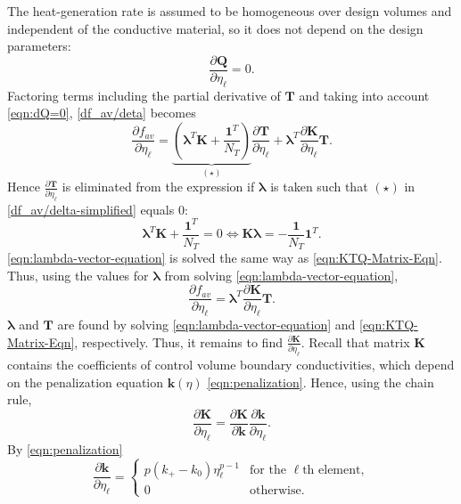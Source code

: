 The heat-generation rate is assumed to be homogeneous over design volumes and independent of the conductive material, so it does not depend on the design parameters: 
\begin{equation}
	\frac{\partial\mathbf{Q}}{\partial\eta_{\ell}}=0.\label{eqn:dQ=0}
\end{equation}
Factoring terms including the partial derivative of $\mathbf{T}$ and taking into account \eqref{eqn:dQ=0}, \eqref{df_av/deta} becomes
\begin{equation}
	\frac{\partial f_{av}}{\partial\eta_{\ell}}=\underbrace{\left(\boldsymbol{\lambda}^T\mathbf{K}+\frac{\mathbf{1}^T}{N_T}\right)}_{(\star)}\frac{\partial\mathbf{T}}{\partial\eta_{\ell}}+\boldsymbol{\lambda}^T\frac{\partial\mathbf{K}}{\partial\eta_{\ell}}\mathbf{T}.\label{df_av/delta-simplified}
\end{equation}
Hence $\frac{\partial\mathbf{T}}{\partial\eta_{\ell}}$ is eliminated from the expression if $\boldsymbol{\lambda}$ is taken such that $(\star)$ in \eqref{df_av/delta-simplified} equals $0$:
\begin{equation}
	\boldsymbol{\lambda}^T\mathbf{K}+\frac{\mathbf{1}^T}{N_T}=0\iff\mathbf{K}\boldsymbol{\lambda}=-\frac{\mathbf{1}}{N_T}\mathbf{1}^T.\label{eqn:lambda-vector-equation}
\end{equation}
\eqref{eqn:lambda-vector-equation} is solved the same way as \eqref{eqn:KTQ-Matrix-Eqn}. Thus, using the values for $\boldsymbol{\lambda}$ from solving \eqref{eqn:lambda-vector-equation},
\begin{equation}
	\frac{\partial f_{av}}{\partial\eta_{\ell}}=\boldsymbol{\lambda}^T\frac{\partial\mathbf{K}}{\partial\eta_{\ell}}\mathbf{T}.\label{eqn:d-f_av}
\end{equation}
$\boldsymbol{\lambda}$ and $\mathbf{T}$ are found by solving \eqref{eqn:lambda-vector-equation} and \eqref{eqn:KTQ-Matrix-Eqn}, respectively. Thus, it remains to find $\frac{\partial\mathbf{K}}{\partial\eta_{\ell}}$. Recall that matrix $\mathbf{K}$ contains the coefficients of control volume boundary conductivities, which depend on the penalization equation $\mathbf{k}(\eta)$ \eqref{eqn:penalization}. Hence, using the chain rule,
\begin{equation}
	\frac{\partial\mathbf{K}}{\partial\eta_{\ell}}=\frac{\partial\mathbf{K}}{\partial\mathbf{k}}\frac{\partial\mathbf{k}}{\partial\eta_{\ell}}.\label{eqn:chain-rule}
\end{equation}
By \eqref{eqn:penalization}
\begin{equation}
	\frac{\partial\mathbf{k}}{\partial\eta_{\ell}}=
	\begin{cases}
		p\left(k_{+}-k_0\right)\eta_{\ell}^{p-1} & \text{for the }\ell\text{th element},\\
		0 & \text{otherwise}.
	\end{cases}
\end{equation}
